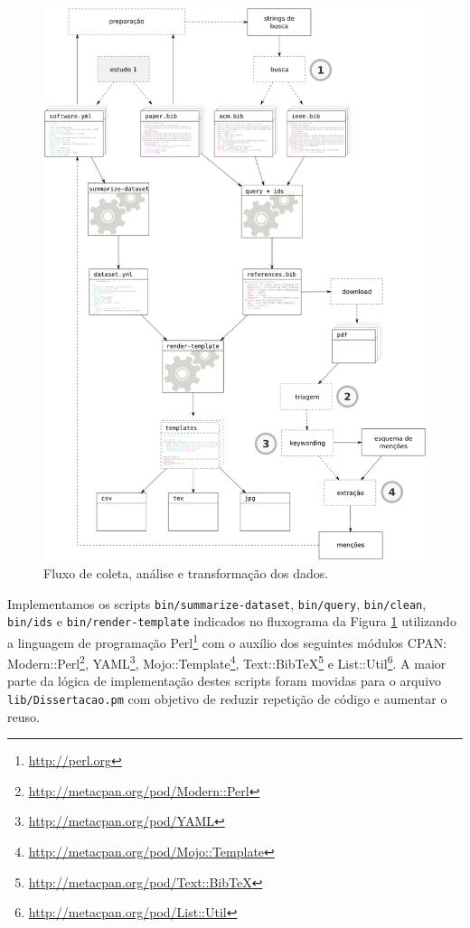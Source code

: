 \begin{figure}[h]
  \center
  \includegraphics[scale=0.4]{imagens/estudo2-fluxograma.png}
  \caption{Fluxo de coleta, análise e transformação dos dados.}
  \label{estudo2-fluxograma}
\end{figure}

Implementamos os scripts \texttt{bin/summarize-dataset}, \texttt{bin/query},
\texttt{bin/clean}, \texttt{bin/ids} e \texttt{bin/render-template} indicados
no fluxograma da Figura \ref{estudo2-fluxograma} utilizando a linguagem de
programação Perl\footnote{\url{http://perl.org}} com o auxílio dos seguintes
módulos CPAN: Modern::Perl\footnote{\url{http://metacpan.org/pod/Modern::Perl}},
YAML\footnote{\url{http://metacpan.org/pod/YAML}},
Mojo::Template\footnote{\url{http://metacpan.org/pod/Mojo::Template}},
Text::BibTeX\footnote{\url{http://metacpan.org/pod/Text::BibTeX}} e
List::Util\footnote{\url{http://metacpan.org/pod/List::Util}}. A maior parte da
lógica de implementação destes scripts foram movidas para o arquivo
\texttt{lib/Dissertacao.pm} com objetivo de reduzir repetição de código e
aumentar o reuso.

